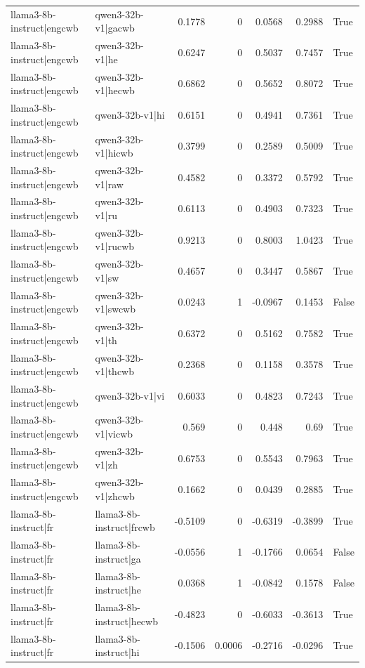 \begin{table}
\begin{tabular}{l l r r r r l}
llama3-8b-instruct|engcwb & qwen3-32b-v1|gacwb & 0.1778 & 0 & 0.0568 & 0.2988 & True \\
llama3-8b-instruct|engcwb & qwen3-32b-v1|he & 0.6247 & 0 & 0.5037 & 0.7457 & True \\
llama3-8b-instruct|engcwb & qwen3-32b-v1|hecwb & 0.6862 & 0 & 0.5652 & 0.8072 & True \\
llama3-8b-instruct|engcwb & qwen3-32b-v1|hi & 0.6151 & 0 & 0.4941 & 0.7361 & True \\
llama3-8b-instruct|engcwb & qwen3-32b-v1|hicwb & 0.3799 & 0 & 0.2589 & 0.5009 & True \\
llama3-8b-instruct|engcwb & qwen3-32b-v1|raw & 0.4582 & 0 & 0.3372 & 0.5792 & True \\
llama3-8b-instruct|engcwb & qwen3-32b-v1|ru & 0.6113 & 0 & 0.4903 & 0.7323 & True \\
llama3-8b-instruct|engcwb & qwen3-32b-v1|rucwb & 0.9213 & 0 & 0.8003 & 1.0423 & True \\
llama3-8b-instruct|engcwb & qwen3-32b-v1|sw & 0.4657 & 0 & 0.3447 & 0.5867 & True \\
llama3-8b-instruct|engcwb & qwen3-32b-v1|swcwb & 0.0243 & 1 & -0.0967 & 0.1453 & False \\
llama3-8b-instruct|engcwb & qwen3-32b-v1|th & 0.6372 & 0 & 0.5162 & 0.7582 & True \\
llama3-8b-instruct|engcwb & qwen3-32b-v1|thcwb & 0.2368 & 0 & 0.1158 & 0.3578 & True \\
llama3-8b-instruct|engcwb & qwen3-32b-v1|vi & 0.6033 & 0 & 0.4823 & 0.7243 & True \\
llama3-8b-instruct|engcwb & qwen3-32b-v1|vicwb & 0.569 & 0 & 0.448 & 0.69 & True \\
llama3-8b-instruct|engcwb & qwen3-32b-v1|zh & 0.6753 & 0 & 0.5543 & 0.7963 & True \\
llama3-8b-instruct|engcwb & qwen3-32b-v1|zhcwb & 0.1662 & 0 & 0.0439 & 0.2885 & True \\
llama3-8b-instruct|fr & llama3-8b-instruct|frcwb & -0.5109 & 0 & -0.6319 & -0.3899 & True \\
llama3-8b-instruct|fr & llama3-8b-instruct|ga & -0.0556 & 1 & -0.1766 & 0.0654 & False \\
llama3-8b-instruct|fr & llama3-8b-instruct|he & 0.0368 & 1 & -0.0842 & 0.1578 & False \\
llama3-8b-instruct|fr & llama3-8b-instruct|hecwb & -0.4823 & 0 & -0.6033 & -0.3613 & True \\
llama3-8b-instruct|fr & llama3-8b-instruct|hi & -0.1506 & 0.0006 & -0.2716 & -0.0296 & True \\

\end{tabular}
\end{table}
